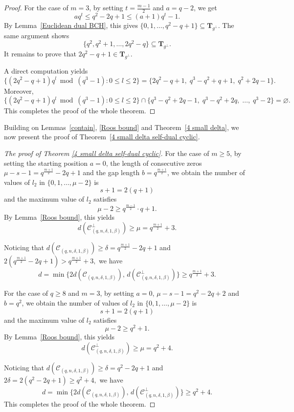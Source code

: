 \documentclass[journal,12pt,onecolumn]{IEEEtran}
\begin{document}
\begin{proof}
	For the case of $m=3$, by setting $t = \frac{m-1}{2}$ and $a = q - 2$, we get
	\[
	a q^t \le q^2 - 2q + 1 \le (a+1)q^t - 1.
	\]
	By Lemma~\ref{Euclidean dual BCH}, this gives
	\(
	\{0,1,\dots,q^2 - q + 1\} \subseteq \mathbf{T}_{g^\perp}.
	\)
	The same argument shows
	\[
	\{q^2, q^2+1, \dots, 2q^2 - q\} \subseteq \mathbf{T}_{g^\perp}.
	\]
	It remains to prove that $2q^2 - q + 1 \in \mathbf{T}_{g^\perp}$.
	
	A direct computation yields
	\[
	\{(2q^2 - q + 1) q^l \bmod (q^3 - 1) : 0 \le l \le 2\}
	= \{2q^2 - q + 1,\; q^3 - q^2 + q + 1,\; q^2 + 2q - 1\}.
	\]
	Moreover,
	\[
	\{(2q^2 - q + 1) q^l \bmod (q^3 - 1) : 0 \le l \le 2\}
	\cap
	\{q^3 - q^2 + 2q - 1,\; q^3 - q^2 + 2q,\; \dots,\; q^3 - 2\}
	= \varnothing.
	\]
	This completes the proof of the whole theorem.
\end{proof}

Building on Lemmas~\ref{contain}, \ref{Roos bound} and Theorem~\ref{4 small delta}, we now present the proof of Theorem~\ref{4 small delta self-dual cyclic}.

\begin{proof}[The proof of Theorem \ref{4 small delta self-dual cyclic}]
    For the case of $m \ge 5$, by setting the starting position $a = 0$, the length of consecutive zeros $\mu - s - 1 = q^{\frac{m+1}{2}} - 2q + 1$ and the gap length $b = q^{\frac{m+1}{2}}$, we obtain the number of values of $l_2$ in $\{0,1,\dots,\mu-2\}$ is
    \[
    s + 1 = 2(q+1)
    \]
    and the maximum value of $l_2$ satisfies
    \[
    \mu - 2 \ge q^{\frac{m-1}{2}} \cdot q + 1.
    \]
    By Lemma~\ref{Roos bound}, this yields
    \[
    d(\mathcal{C}^\perp_{(q,n,\delta,1,\beta)}) \ge \mu = q^{\frac{m+1}{2}} + 3.
    \]
    
    Noticing that $d(\mathcal{C}_{(q,n,\delta,1,\beta)}) \ge \delta = q^{\frac{m+1}{2}} - 2q + 1$ and
    \(
    2(q^{\frac{m+1}{2}} - 2q + 1) > q^{\frac{m+1}{2}} + 3,
    \)
    we have
    \[
    d = \min\{2d(\mathcal{C}_{(q,n,\delta,1,\beta)}),\, d(\mathcal{C}^\perp_{(q,n,\delta,1,\beta)})\} \ge q^{\frac{m+1}{2}} + 3.
    \]
    
    For the case of $q\ge 8$ and $m = 3$, by setting $a = 0$, $\mu - s - 1 = q^2 - 2q + 2$ and $b = q^2$, we obtain the number of values of $l_2$ in $\{0,1,\dots,\mu-2\}$ is
    \[
    s + 1 = 2(q+1)
    \]
    and the maximum value of $l_2$ satisfies
    \[
    \mu - 2 \ge q^2 + 1.
    \]
    By Lemma~\ref{Roos bound}, this yields
    \[
    d(\mathcal{C}^\perp_{(q,n,\delta,1,\beta)}) \ge \mu = q^2 + 4.
    \]
    
    Noticing that $d(\mathcal{C}_{(q,n,\delta,1,\beta)}) \ge \delta = q^2 - 2q + 1$ and
    \(
    2\delta = 2(q^2 - 2q + 1) \ge q^2 + 4,
    \)
    we have
    \[
    d = \min\{2d(\mathcal{C}_{(q,n,\delta,1,\beta)}),\, d(\mathcal{C}^\perp_{(q,n,\delta,1,\beta)})\} \ge q^2 + 4.
    \]
    This completes the proof of the whole theorem.
\end{proof}
\end{document}
